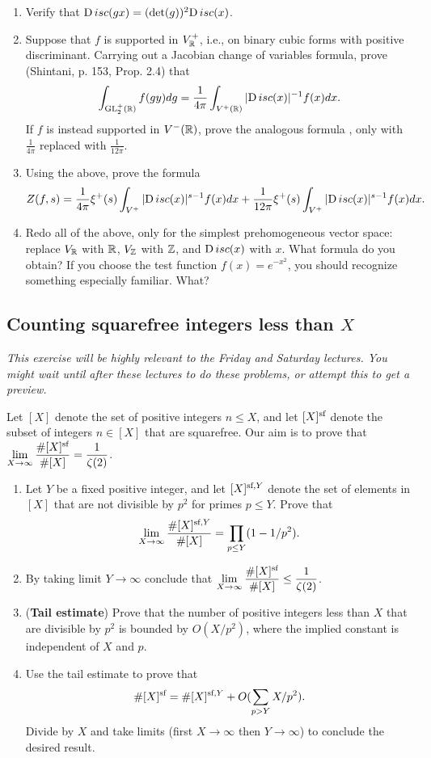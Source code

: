 \documentclass[12pt,amsfont]{amsart}
\begin{document}
\begin{enumerate}
\begin{enumerate}
\item
Verify that
$\Disc(gx) = (\det(g))^2 \Disc(x)$.
\item
Suppose that $f$ is supported in $V^+_{\R}$, i.e., on binary cubic forms with positive discriminant.
Carrying out a Jacobian change of variables formula, prove (Shintani, p. 153, Prop. 2.4) that
\[
\int_{\GL_2^+(\R)} f(gy) dg = \frac{1}{4 \pi} \int_{V^+(\R)} |\Disc(x)|^{-1} f(x) dx.
\]
If $f$ is instead supported in $V^-(\R)$, prove the analogous formula , only with $\frac{1}{4 \pi}$ replaced
with $\frac{1}{12 \pi}$.
\item
Using the above, prove the formula
\[
Z(f, s) = \frac{1}{4 \pi} \xi^+(s) \int_{V^+} |\Disc(x)|^{s - 1} f(x) dx + 
\frac{1}{12 \pi} \xi^+(s) \int_{V^+} |\Disc(x)|^{s - 1} f(x) dx.
\]
\item
Redo all of the above, only for the simplest prehomogeneous vector space:
replace $V_{\R}$ with $\R$, $V_{\Z}$ with $\Z$, and $\Disc(x)$ with $x$. What formula do you obtain?
If you choose the test function $f(x) = e^{-x^2}$, you should recognize something especially familiar.
What?

\end{enumerate}
\end{enumerate}

\subsection{\textbf{Counting squarefree integers less than $X$}}

{\itshape This exercise will be highly relevant to the Friday and Saturday lectures. You might
wait until after these lectures to do these problems, or attempt this to get a preview.}

Let $[X]$ denote the set of positive integers $n\leq X$, and let
$[X]^\sf$ denote the subset of integers $n\in[X]$ that are
squarefree. Our aim is to prove that
$\displaystyle\lim_{X\to\infty}\frac{\#[X]^\sf}{\#[X]}=\frac{1}{\zeta(2)}$.
\begin{enumerate}
\item Let $Y$ be a fixed positive integer, and let $[X]^{\sf,Y}$ denote the
set of elements in $[X]$ that are not divisible by $p^2$ for primes
$p\leq Y$. Prove that
$$\displaystyle\lim_{X\to\infty}\frac{\#[X]^{\sf,Y}}{\#[X]}=\prod_{p\leq
    Y}(1-1/p^2).$$
\item By taking limit $Y\to\infty$ conclude that $\displaystyle\lim_{X\to\infty}\frac{\#[X]^\sf}{\#[X]}\leq\frac{1}{\zeta(2)}$.
\item ({\bf Tail estimate}) Prove that the number of positive integers
  less than $X$ that are divisible by $p^2$ is bounded by $O(X/p^2)$,
  where the implied constant is independent of $X$ and $p$.
\item Use the tail estimate to prove that
$$
\#[X]^\sf=\#[X]^{\sf,Y}+O(\sum_{p>Y}X/p^2).
$$ Divide by $X$ and take limits (first $X\to\infty$ then
$Y\to\infty$) to conclude the desired result.
\end{enumerate}
\end{document}
